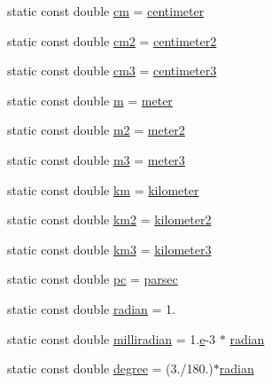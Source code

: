 \begin{DoxyCompactItemize}
\item 
static const double \hyperlink{namespacedd4hep_a1f3cfefacfa8c2174102824c534c71b8}{cm} = \hyperlink{namespacedd4hep_af17522b334712876a204971dee26c063}{centimeter}
\item 
static const double \hyperlink{namespacedd4hep_aaa4f14a45d39e83ade706dcfce865a35}{cm2} = \hyperlink{namespacedd4hep_a43a537cf81dbb2fb1476264a37bb3945}{centimeter2}
\item 
static const double \hyperlink{namespacedd4hep_a6464c11bda4aa7d6c4d42f70dbcaf803}{cm3} = \hyperlink{namespacedd4hep_a5d565a155d7d3b225e52dc0b97c8186d}{centimeter3}
\item 
static const double \hyperlink{namespacedd4hep_a443d1517e365c8f0c3a498bff0f09088}{m} = \hyperlink{namespacedd4hep_a46f5cf0231796af4296a307a58812b06}{meter}
\item 
static const double \hyperlink{namespacedd4hep_aea4ab60384218f15ec3ba53896735b6c}{m2} = \hyperlink{namespacedd4hep_afe718b0d811af6b4d45c556e3a0e87a3}{meter2}
\item 
static const double \hyperlink{namespacedd4hep_a9e16f264f9812fefbe417d510185205b}{m3} = \hyperlink{namespacedd4hep_a4f771b88b1ff2018c0dacd3a1b56023b}{meter3}
\item 
static const double \hyperlink{namespacedd4hep_ab6ce99bfb21ce99b93b69efc2f5ad7a4}{km} = \hyperlink{namespacedd4hep_a689bd0289c6c83e392d385bc870a34ab}{kilometer}
\item 
static const double \hyperlink{namespacedd4hep_a94b468639aec795c528305ad9ba0245e}{km2} = \hyperlink{namespacedd4hep_a61bb5393f7b8ec3694cb8e522145695f}{kilometer2}
\item 
static const double \hyperlink{namespacedd4hep_a4f0627a7e7338d69e3d58675ddbd95f6}{km3} = \hyperlink{namespacedd4hep_a4501dea229a9ace2c46c427c69ddb5aa}{kilometer3}
\item 
static const double \hyperlink{namespacedd4hep_a463cd79bb27007361a510abb0d10665d}{pc} = \hyperlink{namespacedd4hep_a6d097c8b8fee88c7f77ebdfe2923ac45}{parsec}
\item 
static const double \hyperlink{namespacedd4hep_aa67a6662923dd0138a6bf6713eddcebb}{radian} = 1.
\item 
static const double \hyperlink{namespacedd4hep_a7502a4a65dcbf4395be335d0ba214a82}{milliradian} = 1.\hyperlink{_volumes_8cpp_a8a9a1f93e9b09afccaec215310e64142}{e}-\/3 $\ast$ \hyperlink{namespacedd4hep_aa67a6662923dd0138a6bf6713eddcebb}{radian}
\item 
static const double \hyperlink{namespacedd4hep_a9fbc5184e0fbd4235e8efb28cc3ab3af}{degree} = (3./180.)$\ast$\hyperlink{namespacedd4hep_aa67a6662923dd0138a6bf6713eddcebb}{radian}

\end{DoxyCompactItemize}
